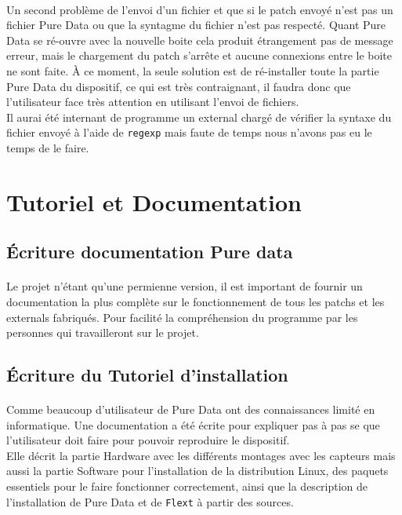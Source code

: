 \documentclass[a4paper, titlepage, oneside, 12pt]{article}%
\begin{document}
\paragraph{}
Un second problème de l'envoi d'un fichier et que si le patch envoyé n'est pas un fichier Pure Data ou que la syntagme du fichier n'est pas respecté. Quant Pure Data se ré-ouvre avec la nouvelle boite cela produit étrangement pas de message erreur, mais le chargement du patch s’arrête et aucune connexions entre le boite ne sont faite. 
À ce moment, la seule solution est de ré-installer toute la partie Pure Data du dispositif, ce qui est très contraignant, il faudra donc que l'utilisateur face très attention en utilisant l'envoi de fichiers.\\
Il aurai été internant de programme un external chargé de vérifier la syntaxe du fichier envoyé à l'aide de \texttt{regexp} mais faute de temps nous n'avons pas eu le temps de le faire.   

\section{Tutoriel et Documentation}
\subsection{Écriture documentation Pure data}
\paragraph{}
Le projet n’étant qu'une permienne version, il est important de fournir un documentation la plus complète sur le fonctionnement de tous les patchs et les externals fabriqués. Pour facilité la compréhension du programme par les personnes qui travailleront sur le projet.
\subsection{Écriture du Tutoriel d'installation}
\paragraph{}
Comme beaucoup d'utilisateur de Pure Data ont des connaissances limité en informatique. Une documentation a été écrite pour expliquer pas à pas se que l'utilisateur doit faire pour pouvoir reproduire le dispositif.\\
Elle décrit la partie Hardware avec les différents montages avec les capteurs mais aussi la partie Software pour l'installation de la distribution Linux, des paquets essentiels pour le faire fonctionner correctement, ainsi que la description de l'installation de Pure Data et de \texttt{Flext} à partir des sources.
\end{document}
